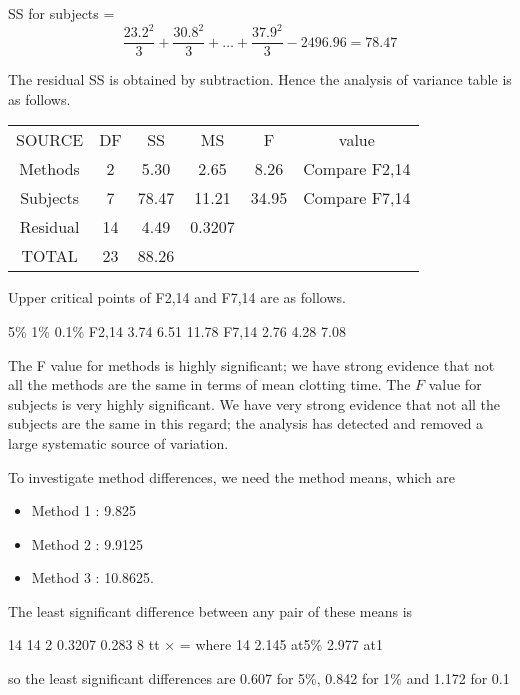 \documentclass[a4paper,12pt]{article}
\begin{document}
SS for subjects = 
\[
\frac{23.2^2}{3} + \frac{30.8^2}{3}  + \ldots + \frac{37.9^2}{3} - 2496.96 =  78.47\] 


 
The residual SS is obtained by subtraction. 
 Hence the analysis of variance table is as follows.
 
 \begin{center}
 \begin{tabular}{cccccc}
 SOURCE & DF&  SS&  MS&  F&  value\\ 
 Methods&   2 &  5.30 &  2.65&        8.26  & Compare F2,14\\ 
 Subjects &  7& 78.47& 11.21&      34.95&   Compare F7,14\\ Residual & 14&    4.49 & 0.3207 & &\\ %
 TOTAL & 23&  88.26 & && \\
 \end{tabular}
 \end{center}
 
Upper critical points of F2,14 and F7,14 are as follows. 
 
 5\% 1\% 0.1\% F2,14 3.74 6.51 11.78 F7,14 2.76 4.28   7.08 
 
 
 
 
The F value for methods is highly significant;  we have strong evidence that not all the methods are the same in terms of mean clotting time.  The $F$ value for subjects is very highly significant.  We have very strong evidence that not all the subjects are the same in this regard;  the analysis has detected and removed a large systematic source of variation. 
 
 
 
To investigate method differences, we need the method means, which are 
 
\begin{itemize}
    \item Method 1 :   9.825         
    \item Method 2 :   9.9125         \item Method 3 :   10.8625. 
\end{itemize}

 
The least significant difference between any pair of these means is 
 
14 14 2 0.3207 0.283 8 tt × =     where   14 2.145 at5\% 2.977 at1%
 
so the least significant differences are 0.607 for 5\%, 0.842 for 1\% and 1.172 for 0.1%
\end{document}
